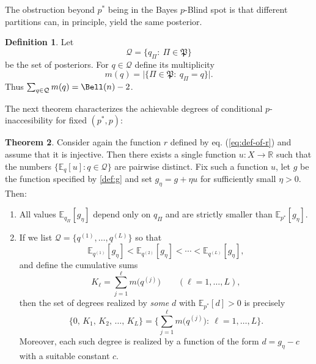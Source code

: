\documentclass[10pt, letterpaper]{article}%
\theoremstyle{definition}
\newtheorem{theorem}{Theorem}[section]
\newtheorem{definition}[theorem]{Definition}
\newcommand{\E}{\mathbb E}
\newcommand{\1}{\mathbf 1}
\begin{document}
The obstruction beyond $p^*$ being in the Bayes $p$-Blind spot is that different partitions can, in principle, yield the same posterior.

\begin{definition}
	Let
	\[
		\mathcal Q=\{q_\Pi:\ \Pi\in\mathfrak P\}
	\]
	be the set of posteriors. For $q\in\mathcal Q$ define its multiplicity
	\[
		m(q)=\big|\{\Pi\in\mathfrak P:\ q_\Pi=q\}\big|.
	\]
	Thus $\sum_{q\in\mathcal Q} m(q)=\Bell(n)-2$.
\end{definition}
The next theorem characterizes the achievable degrees of conditional $p$-inaccesibility for fixed $(p^*,p)$:
\begin{theorem}\label{thm:degrees}
	Consider again the function $r$ defined by eq. (\ref{eq:def-of-r}) and assume that it is injective. Then there exists a single function $u:X\to\mathbb R$ such that the numbers
	$\{\E_q[u]:q\in\mathcal Q\}$ are pairwise distinct. Fix such a function $u$, let $g$ be the function specified by \eqref{def:g} and set $g_\eta=g+\eta u$
	for sufficiently small $\eta>0$.
	Then:
	\begin{enumerate}
		\item All values $\E_{q_\Pi}[g_\eta]$ depend only on $q_\Pi$ and are strictly smaller than $\E_{p^*}[g_\eta]$.
		\item If we list $\mathcal Q=\{q^{(1)},\dots,q^{(L)}\}$ so that
		\[
			\E_{q^{(1)}}[g_\eta]<\E_{q^{(2)}}[g_\eta]<\cdots<\E_{q^{(L)}}[g_\eta],
		\]
		and define the cumulative sums
		\[
			K_\ell=\sum_{j=1}^{\ell} m\big(q^{(j)}\big)\qquad(\ell=1,\dots,L),
		\]
		then the set of degrees realized by \emph{some} $d$ with $\E_{p^*}[d]>0$ is precisely
		\[
			\{0,\,K_1,\,K_2,\,\dots,\,K_L\}=\Big\{\sum_{j=1}^{\ell} m\big(q^{(j)}\big):\ \ell = 1, \ldots, L\Big\}.
		\]
		Moreover, each such degree is realized by a function of the form $d=g_\eta-c$ with a suitable constant $c$.
	\end{enumerate}
\end{theorem}
\end{document}
